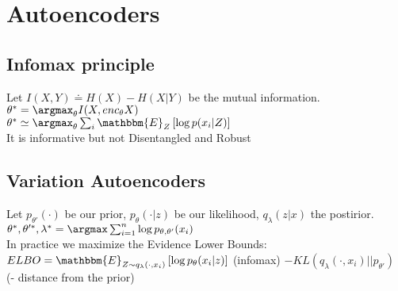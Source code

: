 \section{Autoencoders}
\subsection*{Infomax principle}
Let $I(X, Y) \doteq H(X) - H(X\vert Y)$ be the mutual information.\\
$\theta^* = \argmax_\theta I(X, {enc}_\theta X)$\\
$\theta^* \simeq \argmax_\theta \sum_i\mathbbm{E}_Z\left[\log p(x_i\vert Z)\right] $\\
It is informative but not Disentangled and Robust
\subsection*{Variation Autoencoders}
Let $p_{\theta'}(\cdot)$ be our prior, $p_\theta(\cdot\vert z)$ be our likelihood, $q_\lambda(z\vert x)$ the postirior.\\
$\theta^*, \theta'^*,\lambda^* = \argmax \sum_{i=1}^n \log p_{\theta, \theta'}(x_i)$\\In practice we maximize the Evidence Lower Bounds: \\
$ELBO = \mathbbm{E}_{Z \sim q_\lambda(\cdot, x_i)}\left[\log{p_\theta (x_i\vert z)}\right]$ (infomax) 
$-KL\left(q_\lambda(\cdot,x_i)\vert \vert p_{\theta'}\right)$ (- distance from the prior)
